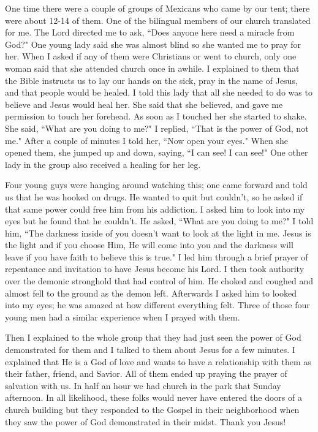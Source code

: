 \documentclass[oneside,12pt]{book}
\begin{document}
One time there were a couple of groups of Mexicans who came by our tent; there were about 12-14 of them. One of the bilingual members of our church translated for me. The Lord directed me to ask, ``Does anyone here need a miracle from God?" One young lady said she was almost blind so she wanted me to pray for her. When I asked if any of them were Christians or went to church, only one woman said that she attended church once in awhile. I explained to them that the Bible instructs us to lay our hands on the sick, pray in the name of Jesus, and that people would be healed. I told this lady that all she needed to do was to believe and Jesus would heal her. She said that she believed, and gave me permission to touch her forehead. As soon as I touched her she started to shake. She said, ``What are you doing to me?" I replied, ``That is the power of God, not me." After a couple of minutes I told her, ``Now open your eyes." When she opened them, she jumped up and down, saying, ``I can see! I can see!" One other lady in the group also received a healing for her leg. 

Four young guys were hanging around watching this; one came forward and told us that he was hooked on drugs. He wanted to quit but couldn't, so he asked if that same power could free him from his addiction. I asked him to look into my eyes but he found that he couldn't. He asked, ``What are you doing to me?" I told him, ``The darkness inside of you doesn't want to look at the light in me. Jesus is the light and if you choose Him, He will come into you and the darkness will leave if you have faith to believe this is true." I led him through a brief prayer of repentance and invitation to have Jesus become his Lord. I then took authority over the demonic stronghold that had control of him. He choked and coughed and almost fell to the ground as the demon left. Afterwards I asked him to looked into my eyes; he was amazed at how different everything felt. Three of those four young men had a similar experience when I prayed with them.

Then I explained to the whole group that they had just seen the power of God demonstrated for them and I talked to them about Jesus for a few minutes. I explained that He is a God of love and wants to have a relationship with them as their father, friend, and Savior. All of them ended up praying the prayer of salvation with us. In half an hour we had church in the park that Sunday afternoon. In all likelihood, these folks would never have entered the doors of a church building but they responded to the Gospel in their neighborhood when they saw the power of God demonstrated in their midst. Thank you Jesus!
\end{document}
